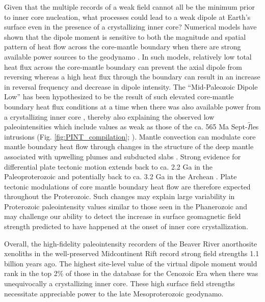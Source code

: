 \documentclass[9pt,twocolumn,twoside,lineno]{pnas-new}
\begin{document}
Given that the multiple records of a weak field cannot all be the minimum prior to inner core nucleation, what processes could lead to a weak dipole at Earth's surface even in the presence of a crystallizing inner core? Numerical models have shown that the dipole moment is sensitive to both the magnitude and spatial pattern of heat flow across the core-mantle boundary when there are strong available power sources to the geodynamo \cite{Olson2007a, Olson2010a}. In such models, relatively low total heat flux across the core-mantle boundary can prevent the axial dipole from reversing whereas a high heat flux through the boundary can result in an increase in reversal frequency and decrease in dipole intensity. The ``Mid-Paleozoic Dipole Low'' has been hypothesized to be the result of such elevated core-mantle boundary heat flux conditions at a time when there was also available power from a crystallizing inner core \cite{Hawkins2019a}, thereby also explaining the observed low paleointensities which include values as weak as those of the ca. 565 Ma Sept-$\hat{I}$les intrusions (Fig. \ref{fig:PINT_compilation}; \citealp{Bono2019a}). Mantle convection can modulate core mantle boundary heat flow through changes in the structure of the deep mantle associated with upwelling plumes \cite{Larson1991a, Courtillot2007a} and subducted slabs \cite{Tan2002b, Biggin2012a, Hounslow2018a}. Strong evidence for differential plate tectonic motion extends back to ca. 2.2 Ga in the Paleoproterozoic \cite{Mitchell2014a,Swanson-Hysell2021b} and potentially back to ca. 3.2 Ga in the Archean \cite{Brenner2020a}. Plate tectonic modulations of core mantle boundary heat flow are therefore expected throughout the Proterozoic. Such changes may explain large variability in Proterozoic paleointensity values similar to those seen in the Phanerozoic \cite{Lloyd2021a} and may challenge our ability to detect the increase in surface geomagnetic field strength predicted to have happened at the onset of inner core crystallization. 

Overall, the high-fidelity paleointensity recorders of the Beaver River anorthosite xenoliths in the well-preserved Midcontinent Rift record strong field strengths 1.1 billion years ago. The highest site-level value of the virtual dipole moment would rank in the top 2$\%$ of those in the database for the Cenozoic Era when there was unequivocally a crystallizing inner core. These high surface field strengths necessitate appreciable power to the late Mesoproterozoic geodynamo. 
\end{document}
